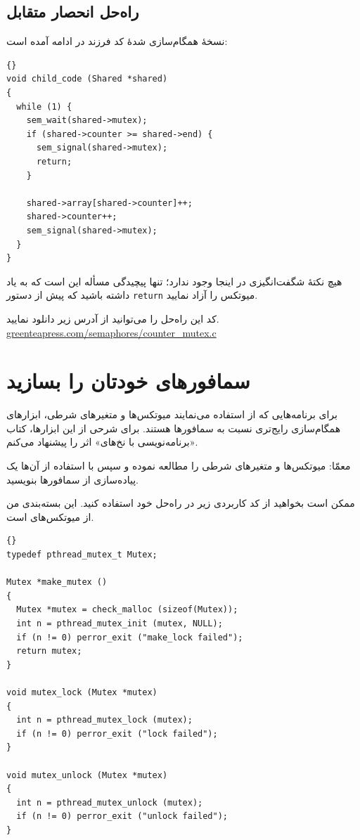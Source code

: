 \documentclass{book}
\newcommand{\clearemptydoublepage}{\newpage\cleardoublepage}
\begin{document}

\clearemptydoublepage
\subsection{راه‌حل انحصار متقابل}

    نسخهٔ همگام‌سازی شدهٔ کد فرزند در ادامه آمده است:

\begin{latin}
\begin{lstlisting}[title={}]{}
void child_code (Shared *shared)
{
  while (1) {
    sem_wait(shared->mutex);
    if (shared->counter >= shared->end) {
      sem_signal(shared->mutex);
      return;
    }

    shared->array[shared->counter]++;
    shared->counter++;
    sem_signal(shared->mutex);
  }
}
\end{lstlisting}
\end{latin}

    هیچ نکتهٔ شگفت‌انگیزی در اینجا وجود ندارد؛ تنها پیچیدگی مسأله این است که به یاد داشته باشید که پیش از دستور {\tt return} میوتکس را آزاد نمایید.
    

    کد این راه‌حل را می‌توانید از آدرس زیر دانلود نمایید.
\url{greenteapress.com/semaphores/counter_mutex.c}


\clearemptydoublepage
\section{سمافورهای خودتان را بسازید}
\label{makeyourown}

    برای  برنامه‌هایی که از  استفاده می‌نمایند میوتکس‌ها و متغیرهای شرطی، ابزارهای همگام‌سازی رایج‌تری نسبت به سمافورها هستند. 
    برای شرحی از این ابزارها، کتاب «برنامه‌نویسی با نخ‌های» 
    اثر  را پیشنهاد می‌کنم. 

    معمّا: میوتکس‌ها و متغیرهای شرطی را مطالعه نموده و سپس با استفاده از آن‌ها یک پیاده‌سازی از سمافورها بنویسید. 

    ممکن است بخواهید از کد کاربردی زیر در راه‌حل خود استفاده کنید. 
    این بسته‌بندی من از میوتکس‌های  است.

\begin{latin}
\begin{lstlisting}[title={}]{}
typedef pthread_mutex_t Mutex;

Mutex *make_mutex ()
{
  Mutex *mutex = check_malloc (sizeof(Mutex));
  int n = pthread_mutex_init (mutex, NULL);
  if (n != 0) perror_exit ("make_lock failed"); 
  return mutex;
}

void mutex_lock (Mutex *mutex)
{
  int n = pthread_mutex_lock (mutex);
  if (n != 0) perror_exit ("lock failed");
}

void mutex_unlock (Mutex *mutex)
{
  int n = pthread_mutex_unlock (mutex);
  if (n != 0) perror_exit ("unlock failed");
}
\end{lstlisting}
\end{latin}
\end{document}
